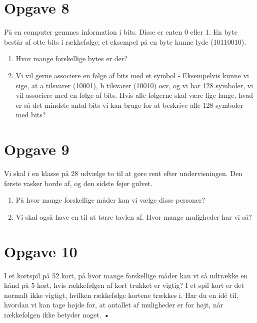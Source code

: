 \section*{Opgave 8}
På en computer gemmes information i bits. Disse er enten 0 eller 1. En byte består af otte bits i rækkefølge; et eksempel på en byte kunne lyde (10110010).
\begin{enumerate}[label=\roman*)]
\item Hvor mange forskellige bytes er der?
\item Vi vil gerne associere en følge af bits med et symbol - Eksempelvis kunne vi sige, at a tilsvarer (10001), b tilsvarer (10010) osv, og vi har 128 symboler, vi vil associere med en følge af bits. Hvis alle følgerne skal være lige lange, hvad er så det mindste antal bits vi kan bruge for at beskrive alle 128 symboler med bits?
\end{enumerate}
\section*{Opgave 9}
Vi skal i en klasse på 28 udvælge to til at gøre rent efter undervisningen. Den første vasker borde af, og den sidste fejer gulvet. 
\begin{enumerate}[label=\roman*)]

\item På hvor mange forskellige måder kan vi vælge disse personer?
\item Vi skal også have en til at tørre tavlen af. Hvor mange muligheder har vi så?

\end{enumerate}
\section*{Opgave 10}
I et kortspil på 52 kort, på hvor mange forskellige måder kan vi så udtrække en hånd på 5 kort, hvis rækkefølgen af kort trukket er vigtig? I et spil kort er det normalt ikke vigtigt, hvilken rækkefølge kortene trækkes i. Har du en idé til, hvordan vi kan tage højde for, at antallet af muligheder er for højt, når rækkefølgen ikke betyder noget. 
\textsl{•}